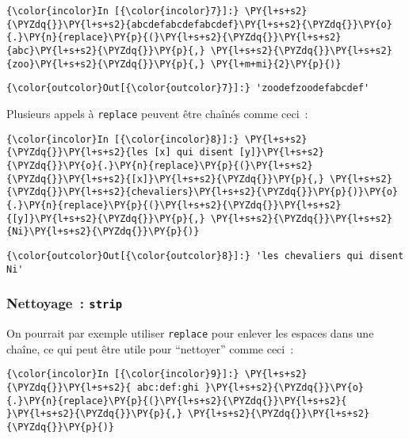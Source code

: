     \begin{Verbatim}[commandchars=\\\{\}]
{\color{incolor}In [{\color{incolor}7}]:} \PY{l+s+s2}{\PYZdq{}}\PY{l+s+s2}{abcdefabcdefabcdef}\PY{l+s+s2}{\PYZdq{}}\PY{o}{.}\PY{n}{replace}\PY{p}{(}\PY{l+s+s2}{\PYZdq{}}\PY{l+s+s2}{abc}\PY{l+s+s2}{\PYZdq{}}\PY{p}{,} \PY{l+s+s2}{\PYZdq{}}\PY{l+s+s2}{zoo}\PY{l+s+s2}{\PYZdq{}}\PY{p}{,} \PY{l+m+mi}{2}\PY{p}{)}
\end{Verbatim}


\begin{Verbatim}[commandchars=\\\{\}]
{\color{outcolor}Out[{\color{outcolor}7}]:} 'zoodefzoodefabcdef'
\end{Verbatim}
            
    Plusieurs appels à \texttt{replace} peuvent être chaînés comme ceci~:

    \begin{Verbatim}[commandchars=\\\{\}]
{\color{incolor}In [{\color{incolor}8}]:} \PY{l+s+s2}{\PYZdq{}}\PY{l+s+s2}{les [x] qui disent [y]}\PY{l+s+s2}{\PYZdq{}}\PY{o}{.}\PY{n}{replace}\PY{p}{(}\PY{l+s+s2}{\PYZdq{}}\PY{l+s+s2}{[x]}\PY{l+s+s2}{\PYZdq{}}\PY{p}{,} \PY{l+s+s2}{\PYZdq{}}\PY{l+s+s2}{chevaliers}\PY{l+s+s2}{\PYZdq{}}\PY{p}{)}\PY{o}{.}\PY{n}{replace}\PY{p}{(}\PY{l+s+s2}{\PYZdq{}}\PY{l+s+s2}{[y]}\PY{l+s+s2}{\PYZdq{}}\PY{p}{,} \PY{l+s+s2}{\PYZdq{}}\PY{l+s+s2}{Ni}\PY{l+s+s2}{\PYZdq{}}\PY{p}{)}
\end{Verbatim}


\begin{Verbatim}[commandchars=\\\{\}]
{\color{outcolor}Out[{\color{outcolor}8}]:} 'les chevaliers qui disent Ni'
\end{Verbatim}
            
    \hypertarget{nettoyage-strip}{%
\subsubsection{\texorpdfstring{Nettoyage~:
\texttt{strip}}{Nettoyage~: strip}}\label{nettoyage-strip}}

    On pourrait par exemple utiliser \texttt{replace} pour enlever les
espaces dans une chaîne, ce qui peut être utile pour ``nettoyer'' comme
ceci~:

    \begin{Verbatim}[commandchars=\\\{\}]
{\color{incolor}In [{\color{incolor}9}]:} \PY{l+s+s2}{\PYZdq{}}\PY{l+s+s2}{ abc:def:ghi }\PY{l+s+s2}{\PYZdq{}}\PY{o}{.}\PY{n}{replace}\PY{p}{(}\PY{l+s+s2}{\PYZdq{}}\PY{l+s+s2}{ }\PY{l+s+s2}{\PYZdq{}}\PY{p}{,} \PY{l+s+s2}{\PYZdq{}}\PY{l+s+s2}{\PYZdq{}}\PY{p}{)}
\end{Verbatim}


